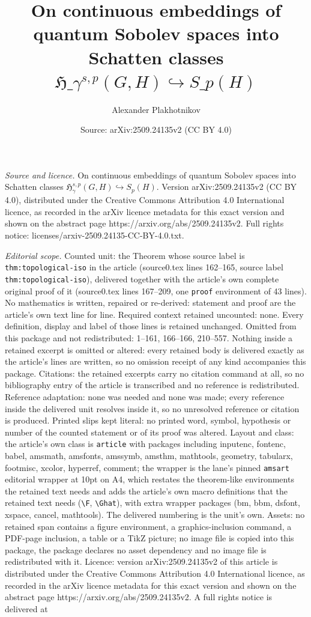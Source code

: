 \documentclass[10pt,a4paper]{amsart}
\title[On continuous embeddings of quantum Sobolev spaces into Scha]{On continuous embeddings of quantum Sobolev spaces into Schatten classes $\mathfrak{H}\_\gamma^{s,p}(G,H) \hookrightarrow S\_p(H)$}
\author{Alexander Plakhotnikov}
\date{Source: arXiv:2509.24135v2 (CC BY 4.0)}
\begin{document}
\maketitle

\noindent\emph{Source and licence.} On continuous embeddings of quantum Sobolev spaces into Schatten classes $\mathfrak{H}_\gamma^{s,p}(G,H) \hookrightarrow S_p(H)$. Version arXiv:2509.24135v2 (CC BY 4.0), distributed under the Creative Commons Attribution 4.0 International licence, as recorded in the arXiv licence metadata for this exact version and shown on the abstract page https://arxiv.org/abs/2509.24135v2. Full rights notice: licenses/arxiv-2509.24135-CC-BY-4.0.txt.\par\smallskip

\noindent\textit{Editorial scope.} Counted unit: the Theorem whose source label is \texttt{thm:topological-iso} in the article (source0.tex lines 162--165, source label \texttt{thm:topological-iso}), delivered together with the article's own complete original proof of it (source0.tex lines 167--209, one \texttt{proof} environment of 43 lines). No mathematics is written, repaired or re-derived: statement and proof are the article's own text line for line. Required context retained uncounted: none. Every definition, display and label of those lines is retained unchanged. Omitted from this package and not redistributed: 1--161, 166--166, 210--557. Nothing inside a retained excerpt is omitted or altered: every retained body is delivered exactly as the article's lines are written, so no omission receipt of any kind accompanies this package. Citations: the retained excerpts carry no citation command at all, so no bibliography entry of the article is transcribed and no reference is redistributed. Reference adaptation: none was needed and none was made; every reference inside the delivered unit resolves inside it, so no unresolved reference or citation is produced. Printed slips kept literal: no printed word, symbol, hypothesis or number of the counted statement or of its proof was altered. Layout and class: the article's own class is \texttt{article} with packages including inputenc, fontenc, babel, amsmath, amsfonts, amssymb, amsthm, mathtools, geometry, tabularx, footmisc, xcolor, hyperref, comment; the wrapper is the lane's pinned \texttt{amsart} editorial wrapper at 10pt on A4, which restates the theorem-like environments the retained text needs and adds the article's own macro definitions that the retained text needs (\texttt{\textbackslash F}, \texttt{\textbackslash Ghat}), with extra wrapper packages (bm, bbm, dsfont, xspace, cancel, mathtools). The delivered numbering is the unit's own. Assets: no retained span contains a figure environment, a graphics-inclusion command, a PDF-page inclusion, a table or a TikZ picture; no image file is copied into this package, the package declares no asset dependency and no image file is redistributed with it. Licence: version arXiv:2509.24135v2 of this article is distributed under the Creative Commons Attribution 4.0 International licence, as recorded in the arXiv licence metadata for this exact version and shown on the abstract page https://arxiv.org/abs/2509.24135v2. A full rights notice is delivered at 
\end{document}
